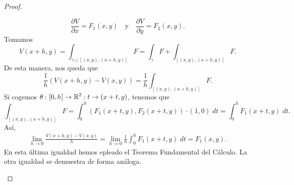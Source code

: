 \begin{proof}
\begin{description}
	\[\frac{\partial V}{\partial x}=F_{1}\left(x,y\right) \quad \text{y} \quad \frac{\partial V}{\partial y} = F_{2}\left(x,y\right) .\]
Tomamos 
\[V\left(x+h, y\right)=\int _{\gamma \cup \left[\left(x,y\right), \left(x + h, y\right)\right] } F = \int _{\gamma }F +\int _{\left[\left(x,y\right), \left(x+h,y\right)\right] }F  .\]
De esta manera, nos queda que 
\[\frac{1}{h}\left(V\left(x+h,y\right)-V\left(x,y\right)\right)=\frac{1}{h} \int _{\left[\left(x,y\right), \left(x+h,y\right)\right] }F.\]
Si cogemos $\displaystyle \theta : \left[0, h\right] \to \mathbb{R}^{2} : t \to \left(x + t, y\right) $, tenemos que 
\[\int _{\left[\left(x,y\right), \left(x+h,y\right)\right] }F=\int^{h}_{0} \left(F_{1}\left(x + t, y\right), F_{2}\left(x + t, y\right)\right) \cdot \left(1,0\right) \; dt = \int^{h}_{0} F_{1}\left(x+t, y\right) \; dt .\]
Así, 
\[
\begin{split}
	\lim_{h \to 0}\frac{V\left(x+h,y\right)-V\left(x,y\right)}{h} =  \lim_{h \to 0} \frac{1}{h}\int^{h}_{0} F_{1}\left(x+t,y\right) \; dt = F_{1}\left(x,y\right) .
\end{split}
\]
En esta última igualdad hemos epleado el Teorema Fundamental del Cálculo. La otra igualdad se demuestra de forma análoga.
\end{description}
\end{proof}
